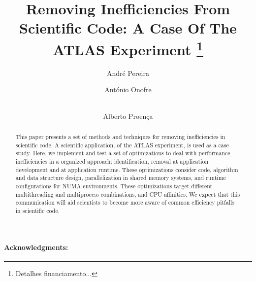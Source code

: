 \documentclass[runningheads,a4paper]{llncs}
\begin{document}
\title{Removing Inefficiencies From Scientific Code: A Case Of The ATLAS Experiment 
\thanks{Detalhes financiamento...}}




%
%
\author{André Pereira \and António Onofre  \and \\ Alberto Proença}
%



\maketitle              %

\begin{abstract}

This paper presents a set of methods and techniques for removing inefficiencies in scientific code. A scientific application, of the ATLAS experiment, is used as a case study. Here, we implement and test a set of optimizations to deal with performance inefficiencies in a organized approach: identification, removal at application development and at application runtime. These optimizations consider code, algorithm and data structure design, parallelization in shared memory systems, and runtime configurations for NUMA environments. These optimizations target different multithreading and multiprocess combinations, and CPU affinities. We expect that this communication will aid scientists to become more aware of common efficiency pitfalls in scientific code.

\end{abstract}
%








\paragraph{Acknowledgments:}




\end{document}
